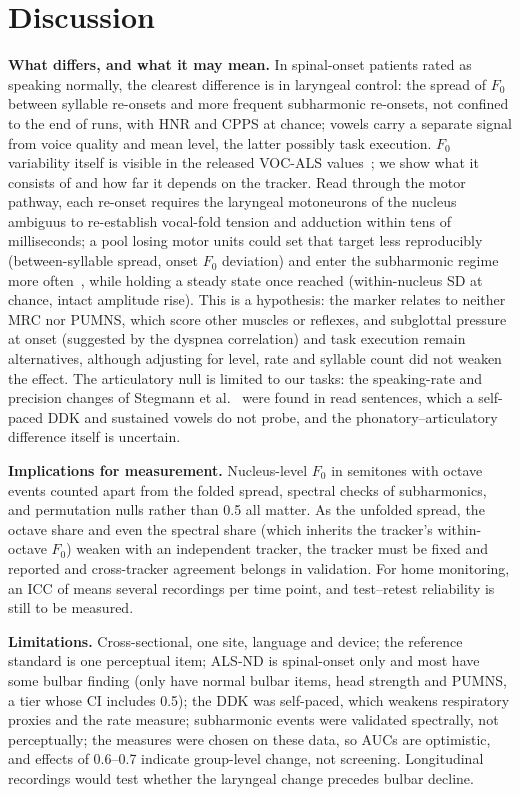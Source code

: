 \documentclass{article}
\begin{document}
\section{Discussion}
\label{sec:discussion}
\textbf{What differs, and what it may mean.} In spinal-onset patients rated as speaking normally, the clearest difference is in laryngeal control: the spread of $F_0$ between syllable re-onsets and more frequent subharmonic re-onsets, not confined to the end of runs, with HNR and CPPS at chance; vowels carry a separate signal from voice quality and mean level, the latter possibly task execution. $F_0$ variability itself is visible in the released VOC-ALS values~\cite{dubbioso2024vocals}; we show what it consists of and how far it depends on the tracker. Read through the motor pathway, each re-onset requires the laryngeal motoneurons of the nucleus ambiguus to re-establish vocal-fold tension and adduction within tens of milliseconds; a pool losing motor units could set that target less reproducibly (between-syllable spread, onset $F_0$ deviation) and enter the subharmonic regime more often~\cite{herzel1994nonlinear}, while holding a steady state once reached (within-nucleus SD at chance, intact amplitude rise). This is a hypothesis: the marker relates to neither MRC nor PUMNS, which score other muscles or reflexes, and subglottal pressure at onset (suggested by the dyspnea correlation) and task execution remain alternatives, although adjusting for level, rate and syllable count did not weaken the effect. The articulatory null is limited to our tasks: the speaking-rate and precision changes of Stegmann et al.~\cite{stegmann2020early} were found in read sentences, which a self-paced DDK and sustained vowels do not probe, and the phonatory--articulatory difference itself is uncertain.

\textbf{Implications for measurement.} Nucleus-level $F_0$ in semitones with octave events counted apart from the folded spread, spectral checks of subharmonics, and permutation nulls rather than 0.5 all matter. As the unfolded spread, the octave share and even the spectral share (which inherits the tracker's within-octave $F_0$) weaken with an independent tracker, the tracker must be fixed and reported and cross-tracker agreement belongs in validation. For home monitoring, an ICC of \iccAll{} means several recordings per time point, and test--retest reliability is still to be measured.

\textbf{Limitations.} Cross-sectional, one site, language and device; the reference standard is one perceptual item; ALS-ND is spinal-onset only and most have some bulbar finding (only \sensDN{} have normal bulbar items, head strength and PUMNS, a tier whose CI includes 0.5); the DDK was self-paced, which weakens respiratory proxies and the rate measure; subharmonic events were validated spectrally, not perceptually; the measures were chosen on these data, so AUCs are optimistic, and effects of 0.6--0.7 indicate group-level change, not screening. Longitudinal recordings would test whether the laryngeal change precedes bulbar decline.
\end{document}
